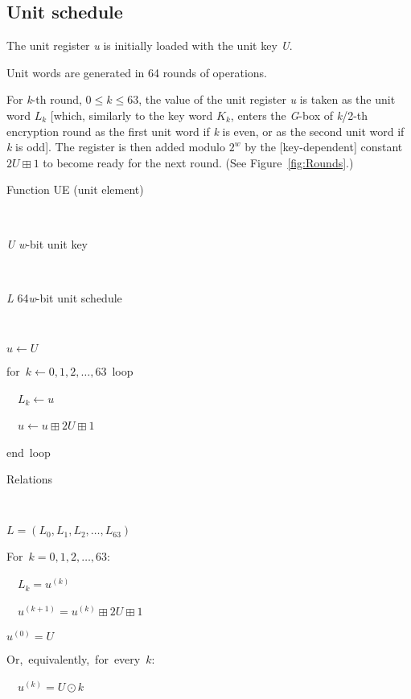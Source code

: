 \documentclass[a4paper,oneside,english]{amsart}
\numberwithin{equation}{section}
\numberwithin{figure}{section}
\newenvironment{lyxlist}[1]
{\begin{list}{}
{\settowidth{\labelwidth}{#1}
 \setlength{\leftmargin}{\labelwidth}
 \addtolength{\leftmargin}{\labelsep}
 \renewcommand{\makelabel}[1]{##1\hfil}}}
{\end{list}}
\newenvironment{lyxcode}
{\par\begin{list}{}{
\setlength{\rightmargin}{\leftmargin}
\setlength{\listparindent}{0pt}\raggedright
\setlength{\itemsep}{0pt}
\setlength{\parsep}{0pt}
\normalfont\ttfamily}\item[]}
{\end{list}}
\begin{document}
\subsection{Unit schedule}

The unit register \emph{u} is initially loaded with the unit key \emph{U}.

Unit words are generated in 64 rounds of operations. 

For \emph{k}-th round, $0\leq k\leq63$, the value of the unit register
\emph{u} is taken as the unit word $L_{k}$ {[}which, similarly to
the key word $K_{k}$, enters the \emph{G}-box of \emph{k}/2-th encryption
round as the first unit word if \emph{k} is even, or as the second
unit word if \emph{k} is odd{]}. The register is then added modulo
$2^{w}$ by the {[}key-dependent{]} constant $2U\boxplus1$ to become
ready for the next round. (See Figure~\ref{fig:Rounds}.)

\begin{algorithm}


\caption{\label{alg:Function-UE}Function UE (unit element)}

\begin{description}
\item [{Input}]~

\begin{lyxlist}{00.00.0000}
\item [{\emph{U}}] \emph{w}-bit unit key
\end{lyxlist}
\item [{Output}]~

\begin{lyxlist}{00.00.0000}
\item [{\emph{L}}] 64\emph{w}-bit unit schedule
\end{lyxlist}
\item [{Pseudo-code}]~\end{description}
\begin{lyxcode}
$u\leftarrow U$

for~$k\leftarrow0,1,2,\ldots,63$~loop

~~$L_{k}\leftarrow u$

~~$u\leftarrow u\boxplus2U\boxplus1$

end~loop~\end{lyxcode}
\begin{description}
\item [{Relations}]~\end{description}
\begin{lyxcode}
$L=(L_{0},L_{1},L_{2},\ldots,L_{63})$

For~$k=0,1,2,\ldots,63$:

~~$L_{k}=u^{(k)}$

~~$u^{(k+1)}=u^{(k)}\boxplus2U\boxplus1$

$u^{(0)}=U$

Or,~equivalently,~for~every~$k$:

~~$u^{(k)}=U\odot k$~\end{lyxcode}
\end{algorithm}
\end{document}
